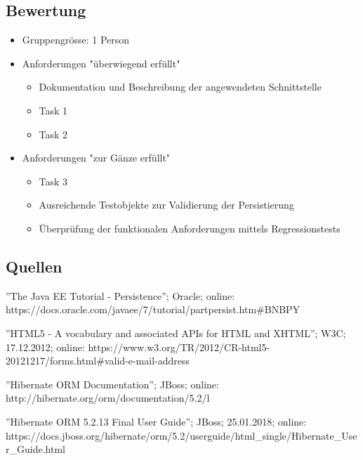 \subsection{Bewertung}

\begin{itemize}
    \item Gruppengr{\"o}sse: 1 Person
    \item Anforderungen "{\"u}berwiegend erf{\"u}llt"
    \begin{itemize}
        \item Dokumentation und Beschreibung der angewendeten Schnittstelle
        \item Task 1
        \item Task 2
    \end{itemize}
    \item Anforderungen "zur G{\"a}nze erf{\"u}llt"
    \begin{itemize}
        \item Task 3
        \item Ausreichende Testobjekte zur Validierung der Persistierung
        \item {\"U}berpr{\"u}fung der funktionalen Anforderungen mittels Regressionstests
    \end{itemize}
\end{itemize}

\subsection{Quellen}

''The Java EE Tutorial - Persistence''; Oracle; online: https://docs.oracle.com/javaee/7/tutorial/partpersist.htm\#BNBPY

''HTML5 - A vocabulary and associated APIs for HTML and XHTML''; W3C; 17.12.2012; online: https://www.w3.org/TR/2012/CR-html5-20121217/forms.html\#valid-e-mail-address

''Hibernate ORM Documentation''; JBoss; online: http://hibernate.org/orm/documentation/5.2/l

''Hibernate ORM 5.2.13 Final User Guide''; JBoss; 25.01.2018; online: https://docs.jboss.org/hibernate/orm/5.2/userguide/html\_single/Hibernate\_User\_Guide.html
\clearpage
